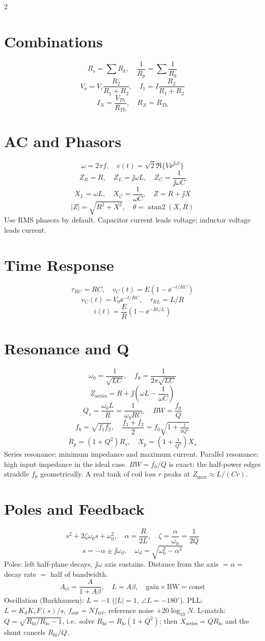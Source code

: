 \documentclass[10pt,letterpaper]{article}
\begin{document}
\begin{multicols}{2}
\section*{Combinations}
\[
R_s=\sum R_k,\quad
\frac{1}{R_p}=\sum\frac{1}{R_k}
\]
\[
V_o=V_i\frac{R_2}{R_1+R_2},\quad
I_1=I\frac{R_2}{R_1+R_2}
\]
\[
I_N=\frac{V_{Th}}{R_{Th}},\quad R_N=R_{Th}
\]

\section*{AC and Phasors}
\[
\omega=2\pi f,\quad
v(t)=\sqrt{2}\Re\{V\ee^{\jj\omega t}\}
\]
\[
Z_R=R,\quad Z_L=\jj\omega L,\quad
Z_C=\frac{1}{\jj\omega C}
\]
\[
X_L=\omega L,\quad X_C=\frac{1}{\omega C},\quad Z=R+\jj X
\]
\[
|Z|=\sqrt{R^2+X^2},\quad \theta=\operatorname{atan2}(X,R)
\]
Use RMS phasors by default. Capacitor current leads voltage; inductor voltage
leads current.

\section*{Time Response}
\[
\tau_{RC}=RC,\quad v_C(t)=E(1-\ee^{-t/RC})
\]
\[
v_C(t)=V_0\ee^{-t/RC},\quad
\tau_{RL}=L/R
\]
\[
i(t)=\frac{E}{R}(1-\ee^{-Rt/L})
\]

\section*{Resonance and Q}
\[
\omega_0=\frac{1}{\sqrt{LC}},\quad
f_0=\frac{1}{2\pi\sqrt{LC}}
\]
\[
Z_{\mathrm{series}}=R+\jj\left(\omega L-\frac{1}{\omega C}\right)
\]
\[
Q_s=\frac{\omega_0L}{R}=\frac{1}{\omega_0RC},\quad
BW=\frac{f_0}{Q}
\]
\[
f_0=\sqrt{f_1f_2},\quad
\frac{f_1+f_2}{2}=f_0\sqrt{1+\tfrac{1}{4Q^2}}
\]
\[
R_p=(1+Q^2)R_s,\quad X_p=\left(1+\tfrac{1}{Q^2}\right)X_s
\]
Series resonance: minimum impedance and maximum current. Parallel resonance:
high input impedance in the ideal case. \(BW=f_0/Q\) is exact; the half-power edges
straddle \(f_0\) geometrically. A real tank of coil loss \(r\) peaks at
\(Z_{\max}\approx L/(Cr)\).

\newpage
\section*{Poles and Feedback}
\[
s^2+2\zeta\omega_0 s+\omega_0^2,\quad
\alpha=\frac{R}{2L},\quad
\zeta=\frac{\alpha}{\omega_0}=\frac{1}{2Q}
\]
\[
s=-\alpha\pm\jj\omega_d,\quad \omega_d=\sqrt{\omega_0^2-\alpha^2}
\]
Poles: left half-plane decays, \(\jj\omega\) axis sustains. Distance from the
axis \(=\alpha=\) decay rate \(=\) half of bandwidth.
\[
A_{\mathrm{cl}}=\frac{A}{1+A\beta},\quad L=A\beta,\quad
\text{gain}\times\text{BW}=\text{const}
\]
Oscillation (Barkhausen): \(L=-1\) (\(|L|=1\), \(\angle L=-180^\circ\)). PLL:
\(L=K_dK_vF(s)/s\), \(f_{\mathrm{out}}=Nf_{\mathrm{ref}}\), reference noise
\(+20\log_{10}N\). L-match: \(Q=\sqrt{R_{\text{hi}}/R_{\text{lo}}-1}\), i.e.\ solve
\(R_{\text{hi}}=R_{\text{lo}}(1+Q^2)\); then \(X_{\text{series}}=QR_{\text{lo}}\) and
the shunt cancels \(R_{\text{hi}}/Q\).


\end{multicols}
\end{document}
